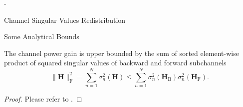\begin{section}{-}
\begin{subsection}{Channel Singular Values Redistribution}
\begin{subsubsection}{Some Analytical Bounds}

			\begin{corollary}
				The channel power gain is upper bounded by the sum of sorted element-wise product of squared singular values of backward and forward subchannels
				\begin{equation}
					\lVert \mathbf{H} \rVert _\mathrm{F}^2 = \sum_{n=1}^N \sigma_n^2(\mathbf{H}) \le \sum_{n=1}^N \sigma_n^2(\mathbf{H}_\mathrm{B}) \sigma_n^2(\mathbf{H}_\mathrm{F}).
					\label{iq:power_gain}
				\end{equation}
			\end{corollary}

			\begin{proof}
				Please refer to \cite[Inequality~24.4.7]{Hogben2013}.
			\end{proof}


\end{subsubsection}
\end{subsection}
\end{section}
